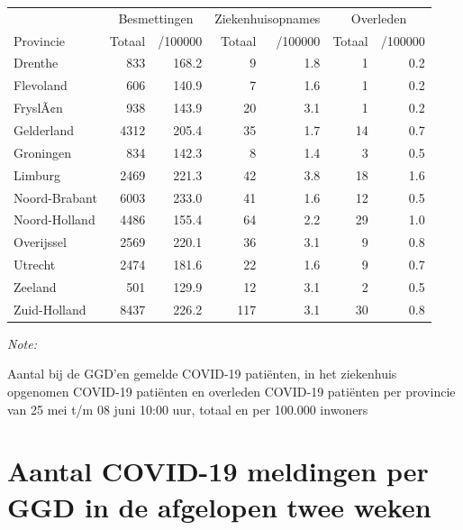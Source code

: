 \documentclass[
  english,
  man,floatsintext]{apa6}
\begin{document}
\begin{table}
\centering
\begin{threeparttable}
\begin{tabular}{lrrrrrr}
\toprule
\multicolumn{1}{c}{ } & \multicolumn{2}{c}{Besmettingen} & \multicolumn{2}{c}{Ziekenhuisopnames} & \multicolumn{2}{c}{Overleden} \\
\cmidrule(l{3pt}r{3pt}){2-3} \cmidrule(l{3pt}r{3pt}){4-5} \cmidrule(l{3pt}r{3pt}){6-7}
Provincie & Totaal & /100000 & Totaal & /100000 & Totaal & /100000\\
\midrule
Drenthe & 833 & 168.2 & 9 & 1.8 & 1 & 0.2\\
Flevoland & 606 & 140.9 & 7 & 1.6 & 1 & 0.2\\
FryslÃ¢n & 938 & 143.9 & 20 & 3.1 & 1 & 0.2\\
Gelderland & 4312 & 205.4 & 35 & 1.7 & 14 & 0.7\\
Groningen & 834 & 142.3 & 8 & 1.4 & 3 & 0.5\\
Limburg & 2469 & 221.3 & 42 & 3.8 & 18 & 1.6\\
Noord-Brabant & 6003 & 233.0 & 41 & 1.6 & 12 & 0.5\\
Noord-Holland & 4486 & 155.4 & 64 & 2.2 & 29 & 1.0\\
Overijssel & 2569 & 220.1 & 36 & 3.1 & 9 & 0.8\\
Utrecht & 2474 & 181.6 & 22 & 1.6 & 9 & 0.7\\
Zeeland & 501 & 129.9 & 12 & 3.1 & 2 & 0.5\\
Zuid-Holland & 8437 & 226.2 & 117 & 3.1 & 30 & 0.8\\
\bottomrule
\end{tabular}
\begin{tablenotes}
\item \textit{Note: } 
\item Aantal bij de GGD’en gemelde COVID-19 patiënten, in het ziekenhuis opgenomen COVID-19 patiënten en overleden COVID-19 patiënten per provincie van 25 mei t/m 08 juni 10:00 uur, totaal en per 100.000 inwoners
\end{tablenotes}
\end{threeparttable}
\end{table}

\newpage

\hypertarget{aantal-covid-19-meldingen-per-ggd-in-de-afgelopen-twee-weken}{%
\section{Aantal COVID-19 meldingen per GGD in de afgelopen twee weken}\label{aantal-covid-19-meldingen-per-ggd-in-de-afgelopen-twee-weken}}
\end{document}
